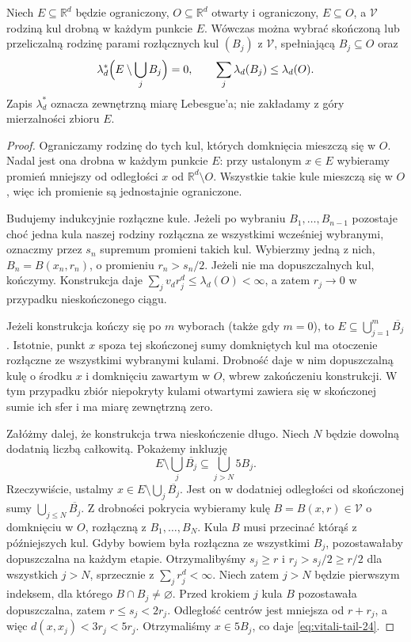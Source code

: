 \begin{twierdzenie}
\label{thm:vitali-cover-24}
Niech $E\subseteq\mathbb R^d$ będzie ograniczony,
$O\subseteq\mathbb R^d$ otwarty i ograniczony, $E\subseteq O$,
a $\mathcal V$ rodziną kul drobną w każdym punkcie $E$.
Wówczas można wybrać skończoną lub przeliczalną rodzinę
parami rozłącznych kul $(B_j)$ z $\mathcal V$, spełniającą
$B_j\subseteq O$ oraz
\[
 \lambda_d^*\Bigl(E\setminus\bigcup_jB_j\Bigr)=0,
 \qquad \sum_j\lambda_d(B_j)\le\lambda_d(O).
\]
Zapis $\lambda_d^*$ oznacza zewnętrzną miarę Lebesgue'a;
nie zakładamy z góry mierzalności zbioru $E$.
\end{twierdzenie}
\begin{proof}
Ograniczamy rodzinę do tych kul, których domknięcia mieszczą
się w $O$. Nadal jest ona drobna w każdym punkcie $E$:
przy ustalonym $x\in E$ wybieramy promień mniejszy od
odległości $x$ od $\mathbb R^d\setminus O$.
Wszystkie takie kule mieszczą się w $O$, więc ich promienie
są jednostajnie ograniczone.

Budujemy indukcyjnie rozłączne kule. Jeżeli po wybraniu
$B_1,\ldots,B_{n-1}$ pozostaje choć jedna kula naszej rodziny
rozłączna ze wszystkimi wcześniej wybranymi, oznaczmy przez
$s_n$ supremum promieni takich kul. Wybierzmy jedną z nich,
$B_n=B(x_n,r_n)$, o promieniu $r_n>s_n/2$. Jeżeli nie ma
dopuszczalnych kul, kończymy. Konstrukcja daje
$\sum_jv_dr_j^d\le\lambda_d(O)<\infty$, a zatem
$r_j\to0$ w przypadku nieskończonego ciągu.

Jeżeli konstrukcja kończy się po $m$ wyborach (także gdy
$m=0$), to $E\subseteq\bigcup_{j=1}^m\overline{B_j}$.
Istotnie, punkt $x$ spoza tej skończonej sumy domkniętych
kul ma otoczenie rozłączne ze wszystkimi wybranymi kulami.
Drobność daje w nim dopuszczalną kulę o środku $x$ i domknięciu
zawartym w $O$, wbrew zakończeniu konstrukcji.
W tym przypadku zbiór niepokryty kulami otwartymi zawiera
się w skończonej sumie ich sfer i ma miarę zewnętrzną zero.

Załóżmy dalej, że konstrukcja trwa nieskończenie długo.
Niech $N$ będzie dowolną dodatnią liczbą całkowitą.
Pokażemy inkluzję
\begin{equation}\label{eq:vitali-tail-24}
 E\setminus\bigcup_j\overline{B_j}
 \subseteq\bigcup_{j>N}5B_j.
\end{equation}
Rzeczywiście, ustalmy $x\in E\setminus\bigcup_j\overline{B_j}$.
Jest on w dodatniej odległości od skończonej sumy
$\bigcup_{j\le N}\overline{B_j}$. Z drobności pokrycia
wybieramy kulę $B=B(x,r)\in\mathcal V$ o domknięciu
w $O$, rozłączną z $B_1,\ldots,B_N$.
Kula $B$ musi przecinać którąś z późniejszych kul. Gdyby bowiem była rozłączna
ze wszystkimi $B_j$, pozostawałaby dopuszczalna na
każdym etapie. Otrzymalibyśmy $s_j\ge r$ i
$r_j>s_j/2\ge r/2$ dla wszystkich $j>N$,
sprzecznie z $\sum_jr_j^d<\infty$.
Niech zatem $j>N$ będzie pierwszym indeksem, dla
którego $B\cap B_j\ne\varnothing$.
Przed krokiem $j$ kula $B$ pozostawała dopuszczalna,
zatem $r\le s_j<2r_j$. Odległość centrów jest mniejsza
od $r+r_j$, a więc $d(x,x_j)<3r_j<5r_j$.
Otrzymaliśmy $x\in5B_j$, co daje \eqref{eq:vitali-tail-24}.


\end{proof}

